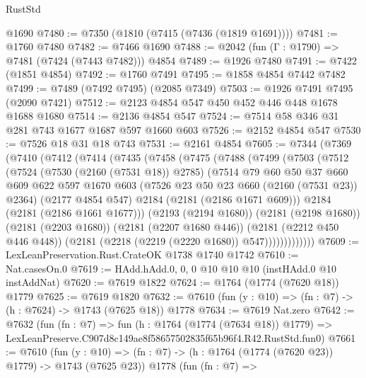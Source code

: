 \begin{lexlean}{RustStd}
\begin{coremodule}
    @1690
@7480 := @7350 (@1810 (@7415 (@7436 (@1819 @1691))))
@7481 := @1760 @7480
@7482 := @7466 @1690
@7488 := @2042 (fun (Γ : @1790) => @7481 (@7424 (@7443 @7482))) @4854
@7489 := @1926 @7480
@7491 := @7422 (@1851 @4854)
@7492 := @1760 @7491
@7495 := @1858 @4854 @7442 @7482
@7499 := @7489 (@7492 @7495) (@2085 @7349)
@7503 := @1926 @7491 @7495 (@2090 @7421)
@7512 := @2123 @4854 @547 @450 @452 @446 @448 @1678 @1688 @1680
@7514 := @2136 @4854 @547
@7524 := @7514 @58 @346 @31 @281 @743 @1677 @1687 @597 @1660 @603
@7526 := @2152 @4854 @547
@7530 := @7526 @18 @31 @18 @743
@7531 := @2161 @4854
@7605 := @7344
    (@7369
      (@7410
        (@7412
          (@7414
            (@7435
              (@7458
                (@7475
                  (@7488
                    (@7499
                      (@7503
                        (@7512
                          (@7524
                            (@7530 (@2160 (@7531 @18)) @2785)
                            (@7514
                              @79
                              @60
                              @50
                              @37
                              @660
                              @609
                              @622
                              @597
                              @1670
                              @603
                              (@7526 @23 @50 @23 @660 (@2160 (@7531 @23)) @2364)
                              (@2177 @4854 @547)
                              @2184
                              (@2181 (@2186 @1671 @609)))
                            @2184
                            (@2181 (@2186 @1661 @1677)))
                          (@2193 (@2194 @1680))
                          (@2181 (@2198 @1680))
                          (@2181 (@2203 @1680))
                          (@2181 (@2207 @1680 @446))
                          (@2181 (@2212 @450 @446 @448))
                          (@2181 (@2218 (@2219 (@2220 @1680)) @547)))))))))))))
@7609 := LexLeanPreservation.Rust.CrateOK @1738 @1740 @1742
@7610 := Nat.casesOn.{0}
@7619 := HAdd.hAdd.{0, 0, 0} @10 @10 @10 (instHAdd.{0} @10 instAddNat)
@7620 := @7619 @1822
@7624 := @1764 (@1774 (@7620 @18)) @1779
@7625 := @7619 @1820
@7632 := @7610 (fun (y : @10) => (fn : @7) -> (h : @7624) -> @1743 (@7625 @18)) @1778
@7634 := @7619 Nat.zero
@7642 := @7632
    (fun (fn : @7) =>
    fun (h : @1764 (@1774 (@7634 @18)) @1779) =>
    LexLeanPreserve.C907d8c149ae8f58657502835f65b96f4.R42.RustStd.fun0)
@7661 := @7610
    (fun (y : @10) => (fn : @7) -> (h : @1764 (@1774 (@7620 @23)) @1779) -> @1743 (@7625 @23))
    @1778
    (fun (fn : @7) =>

\end{coremodule}
\end{lexlean}
